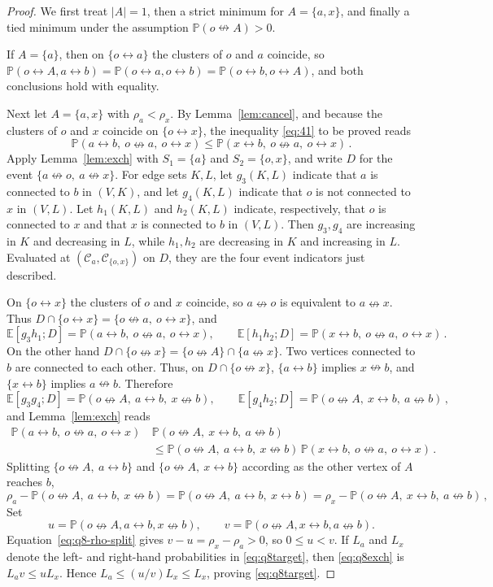 \documentclass[11pt]{article}
\theoremstyle{definition}
\theoremstyle{remark}
\newcommand{\PP}{\mathbb P}
\newcommand{\EE}{\mathbb E}
\newcommand{\con}{\leftrightarrow}
\newcommand{\ncon}{\nleftrightarrow}
\newcommand{\eC}{\mathcal C}
\begin{document}
\begin{proof}
We first treat $|A|=1$, then a strict minimum for $A=\{a,x\}$, and finally a tied minimum
under the assumption $\PP(o\ncon A)>0$.

If $A=\{a\}$, then on $\{o\con a\}$ the clusters of $o$ and $a$ coincide, so $\PP(o\con
A,a\con b)=\PP(o\con a,o\con b)=\PP(o\con b,o\con A)$, and both conclusions hold with
equality.

Next let $A=\{a,x\}$ with $\rho_a<\rho_x$. By Lemma~\ref{lem:cancel}, and because the
clusters of $o$ and $x$ coincide on $\{o\con x\}$, the inequality \eqref{eq:41} to be
proved reads
\begin{equation}\label{eq:q8target}
 \PP(a\con b,\ o\ncon a,\ o\con x)\leq \PP(x\con b,\ o\ncon a,\ o\con x)\,.
\end{equation}
Apply Lemma~\ref{lem:exch} with $S_1=\{a\}$ and $S_2=\{o,x\}$, and write $D$ for the event
$\{a\ncon o,\ a\ncon x\}$. For edge sets $K,L$, let $g_3(K,L)$ indicate that $a$ is
connected to $b$ in $(V,K)$, and let $g_4(K,L)$ indicate that $o$ is not connected to
$x$ in $(V,L)$. Let $h_1(K,L)$ and $h_2(K,L)$ indicate, respectively, that $o$ is
connected to $x$ and that $x$ is connected to $b$ in $(V,L)$. Then $g_3,g_4$ are
increasing in $K$ and decreasing in $L$, while $h_1,h_2$ are decreasing in $K$ and
increasing in $L$. Evaluated at $(\eC_a,\eC_{\{o,x\}})$ on $D$, they are the four event
indicators just described.

On $\{o\con x\}$ the clusters of $o$ and $x$ coincide, so $a\ncon o$ is equivalent to
$a\ncon x$. Thus $D\cap\{o\con x\}=\{o\ncon a,\ o\con x\}$, and
\[
 \EE[g_3h_1;D]=\PP(a\con b,\ o\ncon a,\ o\con x),\qquad
 \EE[h_1h_2;D]=\PP(x\con b,\ o\ncon a,\ o\con x)\,.
\]
On the other hand $D\cap\{o\ncon x\}=\{o\ncon A\}\cap\{a\ncon x\}$. Two vertices connected
to $b$ are connected to each other. Thus, on $D\cap\{o\ncon x\}$, $\{a\con b\}$ implies $x\ncon b$, and
$\{x\con b\}$ implies $a\ncon b$. Therefore
\[
 \EE[g_3g_4;D]=\PP(o\ncon A,\ a\con b,\ x\ncon b),\qquad
 \EE[g_4h_2;D]=\PP(o\ncon A,\ x\con b,\ a\ncon b)\,,
\]
and Lemma~\ref{lem:exch} reads
\begin{equation}\label{eq:q8exch}
\begin{split}
 \PP(a\con b,\ o\ncon a,\ o\con x)\,&\PP(o\ncon A,\ x\con b,\ a\ncon b)\\
 &\leq \PP(o\ncon A,\ a\con b,\ x\ncon b)\,\PP(x\con b,\ o\ncon a,\ o\con x)\,.
\end{split}
\end{equation}
Splitting $\{o\ncon A,\ a\con b\}$ and $\{o\ncon A,\ x\con b\}$ according as the other
vertex of $A$ reaches $b$,
\begin{equation}\label{eq:q8-rho-split}
 \rho_a-\PP(o\ncon A,\ a\con b,\ x\ncon b)
 =\PP(o\ncon A,\ a\con b,\ x\con b)
 =\rho_x-\PP(o\ncon A,\ x\con b,\ a\ncon b)\,,
\end{equation}
Set
\[
 u=\PP(o\ncon A,a\con b,x\ncon b),\qquad
 v=\PP(o\ncon A,x\con b,a\ncon b).
\]
Equation~\eqref{eq:q8-rho-split} gives $v-u=\rho_x-\rho_a>0$, so $0\leq u<v$. If $L_a$ and $L_x$
denote the left- and right-hand probabilities in \eqref{eq:q8target}, then
\eqref{eq:q8exch} is $L_av\leq uL_x$. Hence
$L_a\leq(u/v)L_x\leq L_x$, proving \eqref{eq:q8target}.


\end{proof}
\end{document}
